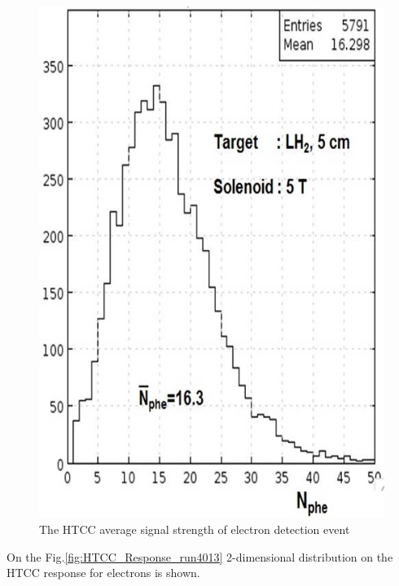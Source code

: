 \begin{figure}[!h]
    \centering
    \includegraphics[width=1.0\linewidth,trim={0.0cm 0.0cm 0.0cm 0.0cm},clip]{images/Average_HTCC_Signal.jpg}
    \caption{The HTCC average signal strength of electron detection event}
    \label{fig:Average_HTCC_Signal}
\end{figure}
On the Fig.\ref{fig:HTCC_Response_run4013} 2-dimensional distribution on the HTCC response for electrons is shown.
